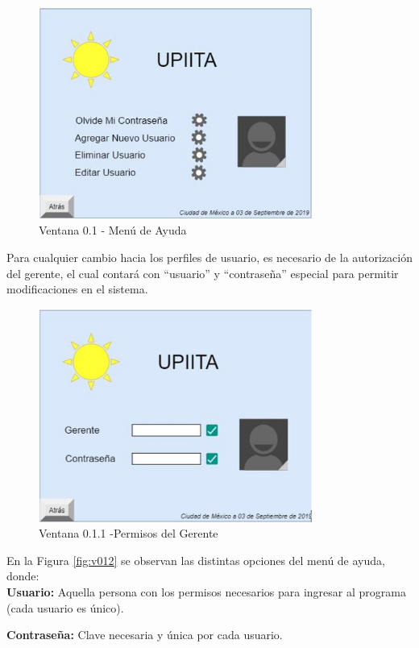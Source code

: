 \begin{figure}[H]
	\centering
	\includegraphics[width=9cm]{imagenes/v01}
	\caption{Ventana 0.1 - Menú de Ayuda}
	\label{fig:v01}
\end{figure}

Para cualquier cambio hacia los perfiles de usuario, es necesario de la autorización del gerente, el cual contará con ``usuario'' y ``contraseña'' especial para permitir modificaciones en el sistema.
\begin{figure}[H]
	\centering
	\includegraphics[width=9cm]{imagenes/v011}
	\caption{Ventana 0.1.1 -Permisos del Gerente}
	\label{fig:v011}
\end{figure}

En la Figura \ref{fig:v012} se observan las distintas opciones del menú de ayuda, donde:\\

\textbf{Usuario:} Aquella persona con los permisos necesarios para ingresar al programa (cada usuario es único).

\textbf{Contraseña:} Clave necesaria y única por cada usuario.


